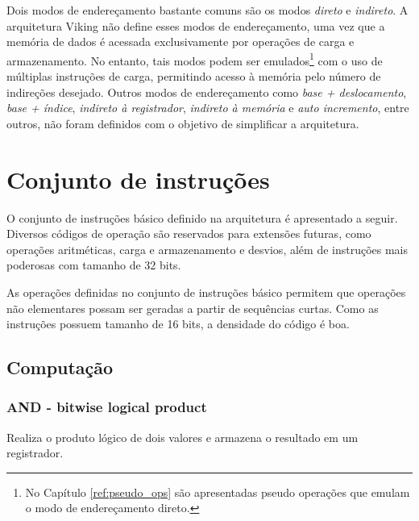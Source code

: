 \documentclass{extreport}
\begin{document}
Dois modos de endereçamento bastante comuns são os modos \textit{direto} e \textit{indireto}. A arquitetura Viking não define esses modos de endereçamento, uma vez que a memória de dados é acessada exclusivamente por operações de carga e armazenamento. No entanto, tais modos podem ser emulados\footnote{No Capítulo \ref{ref:pseudo_ops} são apresentadas pseudo operações que emulam o modo de endereçamento direto.} com o uso de múltiplas instruções de carga, permitindo acesso à memória pelo número de indireções desejado. Outros modos de endereçamento como \textit{base + deslocamento}, \textit{base + índice}, \textit{indireto à registrador}, \textit{indireto à memória} e \textit{auto incremento}, entre outros, não foram definidos com o objetivo de simplificar a arquitetura.

\section{Conjunto de instruções}

O conjunto de instruções básico definido na arquitetura é apresentado a seguir. Diversos códigos de operação são reservados para extensões futuras, como operações aritméticas, carga e armazenamento e desvios, além de instruções mais poderosas com tamanho de 32 bits.

As operações definidas no conjunto de instruções básico permitem que operações não elementares possam ser geradas a partir de sequências curtas. Como as instruções possuem tamanho de 16 bits, a densidade do código é boa.

\subsection{Computação}

\subsubsection{AND - bitwise logical product}
Realiza o produto lógico de dois valores e armazena o resultado em um registrador.
\end{document}
